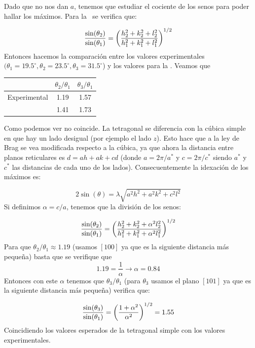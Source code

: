 \begin{solucion}
	Dado que no nos dan $a$, tenemos que estudiar el cociente de los senos para poder hallar los máximos. Para la \sc \ se verifica que:
	
	\begin{equation*}
		\frac{\sin(\theta_2)}{\sin (\theta_1)} = \left( \frac{h_2^2 + k_2^2 + l_2^2}{h_1^2 + k_1^2 + l_1^2} \right)^{1/2}
	\end{equation*}
	Entonces hacemos la comparación entre los valores experimentales $(\theta_1=19.5^\circ,\theta_2=23.5^\circ,\theta_3=31.5^\circ$) y los valores para la \sc. Veamos que 
	\begin{center}
		\begin{tabular}{c|c|c}
			& $\theta_2/\theta_1$ & $\theta_3/\theta_1$ \\ \hline
			Experimental &  1.19 & 1.57  \\ 
			\sc  & 1.41 & 1.73
		\end{tabular}
	\end{center}
	Como podemos ver no coincide. La tetragonal se diferencia con la cúbica simple en que hay un lado desigual (por ejemplo el lado $z$). Esto hace que a la ley de Brag se vea modificada respecto a la cúbica, ya que ahora la distancia entre planos reticulares es $d=ah+ak+cd$ (donde $a=2\pi/a^*$ y $c=2\pi/c^*$ siendo $a^*$ y $c^*$ las distancias de cada uno de los lados). Consecuentemente la idexación de los máximos es:
	
	\begin{equation*}
		2 \sin (\theta) = \lambda \sqrt{a^2 h^2 + a^2 k^2 + c^2 l^2}
	\end{equation*}
	Si definimos $\alpha=c/a$, tenemos que la división de los senos: 
	
	\begin{equation*}
		\frac{\sin(\theta_2)}{\sin (\theta_1)} = \left( \frac{h_2^2 + k_2^2 + \alpha^2 l_2^2}{h_1^2 + k_1^2 + \alpha^2 l_1^2} \right)^{1/2}
	\end{equation*} 
	Para que $\theta_2/\theta_1\approx 1.19$ (usamos $[100]$ ya que es la siguiente distancia más pequeña) basta que se verifique que 
	\begin{equation*}
		1.19 = \frac{1}{\alpha} \rightarrow \alpha = 0.84
	\end{equation*}
	Entonces con este $\alpha$ tenemos que $\theta_3/\theta_1$ (para $\theta_3 $ usamos el plano $[101]$ ya que es la siguiente distancia más pequeña) verifica que:
	
	\begin{equation*}
		\frac{\sin(\theta_3)}{\sin (\theta_1)} = \left( \frac{1+\alpha^2}{\alpha^2} \right)^{1/2} = 1.55  		
	\end{equation*}
	Coincidiendo los valores esperados de la tetragonal simple con los valores experimentales.
\end{solucion}

